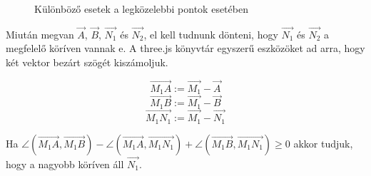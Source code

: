 \begin{figure}[h!]

\caption{Különböző esetek a legközelebbi pontok esetében}
\label{fig:nearest-circle-intersection-examples}
\end{figure}

\pagebreak

Miután megvan $\overrightarrow{A}$, $\overrightarrow{B}$, $\overrightarrow{N_1}$ és $\overrightarrow{N_2}$, el kell tudnunk dönteni, hogy $\overrightarrow{N_1}$ és $\overrightarrow{N_2}$ a megfelelő köríven vannak e. A three.js könyvtár egyszerű eszközöket ad arra, hogy két vektor bezárt szögét kiszámoljuk.

$$\overrightarrow{M_1A} := \overrightarrow{M_1} - \overrightarrow{A}$$
$$\overrightarrow{M_1B} := \overrightarrow{M_1} - \overrightarrow{B}$$
$$\overrightarrow{M_1N_1} := \overrightarrow{M_1} - \overrightarrow{N_1}$$

 Ha $\angle(\overrightarrow{M_1A}, \overrightarrow{M_1B}) - \angle(\overrightarrow{M_1A}, \overrightarrow{M_1N_1}) + \angle(\overrightarrow{M_1B}, \overrightarrow{M_1N_1}) \ge 0$ akkor tudjuk, hogy a nagyobb köríven áll $\overrightarrow{N_1}$.

